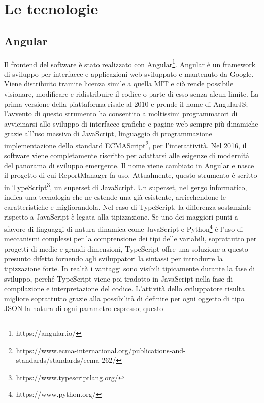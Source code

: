\chapter{Le tecnologie}\label{c:technologies}

\section{Angular}

Il frontend del software è stato realizzato con Angular\footnote{https://angular.io/}.
Angular è un framework di sviluppo per interfacce e applicazioni web sviluppato e mantenuto da Google.
Viene distribuito tramite licenza simile a quella MIT e ciò rende possibile visionare, modificare e ridistribuire il codice o parte di esso senza alcun limite.
La prima versione della piattaforma risale al 2010 e prende il nome di AngularJS; l'avvento di questo strumento ha consentito a moltissimi programmatori di avvicinarsi
allo sviluppo di interfacce grafiche e pagine web sempre più dinamiche grazie all'uso massivo di JavaScript, linguaggio di programmazione implementazione dello standard
ECMAScript\footnote{https://www.ecma-international.org/publications-and-standards/standards/ecma-262/}, per l'interattività.
Nel 2016, il software viene completamente riscritto per adattarsi alle esigenze di modernità del panorama di sviluppo emergente.
Il nome viene cambiato in Angular e nasce il progetto di cui ReportManager fa uso.
Attualmente, questo strumento è scritto in TypeScript\footnote{https://www.typescriptlang.org/}, un superset di JavaScript.
Un superset, nel gergo informatico, indica una tecnologia che ne estende una già esistente, arricchendone le caratteristiche e migliorandola.
Nel caso di TypeScript, la differenza sostanziale rispetto a JavaScript è legata alla tipizzazione.
Se uno dei maggiori punti a sfavore di linguaggi di natura dinamica come JavaScript e Python\footnote{https://www.python.org/} è l'uso di meccanismi complessi per la comprensione
dei tipi delle variabili, soprattutto per progetti di medie e grandi dimensioni, TypeScript offre una soluzione a questo presunto difetto fornendo agli sviluppatori la sintassi
per introdurre la tipizzazione forte.
In realtà i vantaggi sono visibili tipicamente durante la fase di sviluppo, perché TypeScript viene poi tradotto in JavaScript nella fase di compilazione e interpretazione del codice.
L'attività dello sviluppatore risulta migliore soprattutto grazie alla possibilità di definire per ogni oggetto di tipo JSON la natura di ogni parametro espresso; questo 

